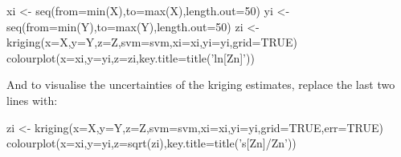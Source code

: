 \begin{enumerate}
\begin{script}[firstnumber=5]
xi <- seq(from=min(X),to=max(X),length.out=50)
yi <- seq(from=min(Y),to=max(Y),length.out=50)
zi <- kriging(x=X,y=Y,z=Z,svm=svm,xi=xi,yi=yi,grid=TRUE)
colourplot(x=xi,y=yi,z=zi,key.title=title('ln[Zn]'))
\end{script}

And to visualise the uncertainties of the kriging estimates,
replace the last two lines with:

\begin{script}[firstnumber=7]
zi <- kriging(x=X,y=Y,z=Z,svm=svm,xi=xi,yi=yi,grid=TRUE,err=TRUE)
colourplot(x=xi,y=yi,z=sqrt(zi),key.title=title('s[Zn]/Zn'))
\end{script}

\end{enumerate}
